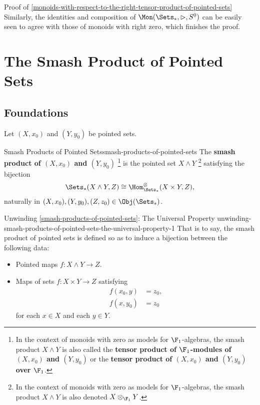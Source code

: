 \begin{Proof}{Proof of \cref{monoids-with-respect-to-the-right-tensor-product-of-pointed-sets}}
    Similarly, the identities and composition of $\Mon(\Sets_{*},\rhd,S^{0})$ can be easily seen to agree with those of monoids with right zero, which finishes the proof.
\end{Proof}
\section{The Smash Product of Pointed Sets}\label{section-the-smash-product-of-pointed-sets}
\subsection{Foundations}\label{subsection-smash-products-of-pointed-sets-foundations}
Let $(X,x_{0})$ and $(Y,y_{0})$ be pointed sets.
\begin{definition}{Smash Products of Pointed Sets}{smash-products-of-pointed-sets}%
    The \textbf{smash product of $(X,x_{0})$ and $(Y,y_{0})$}%
    \footnote{%
        In the context of monoids with zero as models for $\F_{1}$-algebras, the smash product $X\wedge Y$ is also called the \textbf{tensor product of $\F_{1}$-modules of $(X,x_{0})$ and $(Y,y_{0})$} or the \textbf{tensor product of $(X,x_{0})$ and $(Y,y_{0})$ over $\F_{1}$}.
    } %
    is the pointed set $X\wedge Y$%
    \footnote{%
        In the context of monoids with zero as models for $\F_{1}$-algebras, the smash product $X\wedge Y$ is also denoted $X\otimes_{\F_{1}}Y$.
        \par\vspace*{\TCBBoxCorrection}
    } %
    satisfying the bijection
    \[
        \Sets_{*}(X\wedge Y,Z)
        \cong
        \Hom^{\otimes}_{\Sets_{*}}(X\times Y,Z),
    \]%
    naturally in $(X,x_{0}),(Y,y_{0}),(Z,z_{0})\in\Obj(\Sets_{*})$.
\end{definition}
\begin{remark}{Unwinding \cref{smash-products-of-pointed-sets}: The Universal Property \rmI}{unwinding-smash-products-of-pointed-sets-the-universal-property-1}%
    That is to say, the smash product of pointed sets is defined so as to induce a bijection between the following data:
    \begin{itemize}
        \item Pointed maps $f\colon X\wedge Y\to Z$.
        \item Maps of sets $f\colon X\times Y\to Z$ satisfying
            \begin{align*}
                f(x_{0},y) &= z_{0},\\
                f(x,y_{0}) &= z_{0}
            \end{align*}
            for each $x\in X$ and each $y\in Y$.
    \end{itemize}
\end{remark}
